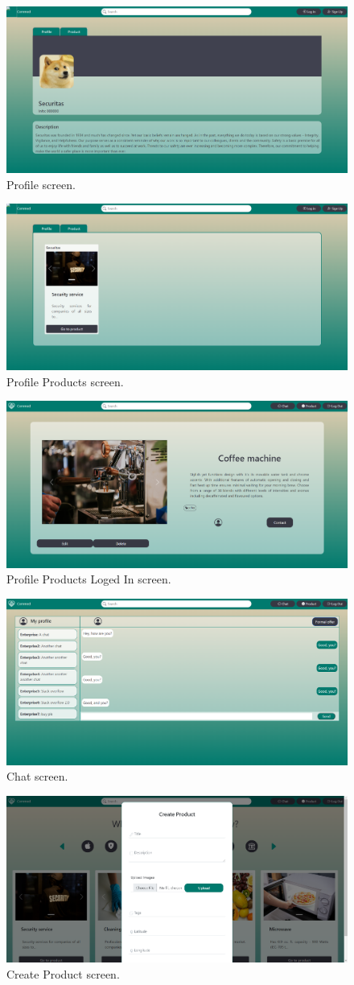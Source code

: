 \documentclass[./main.tex]{subfiles}
\begin{document}
\begin{figure}[H]
  \centering
  \includegraphics[width=0.5\linewidth]{img/webclient_6.png}
  \caption{Profile screen.}
  \label{fig:webclient-screen-5}
\end{figure}
\begin{figure}[H]
  \centering
  \includegraphics[width=0.5\linewidth]{img/webclient_7.png}
  \caption{Profile Products screen.}
  \label{fig:webclient-screen-6}
\end{figure}
\begin{figure}[H]
  \centering
  \includegraphics[width=0.5\linewidth]{img/webclient_8.png}
  \caption{Profile Products Loged In screen.}
  \label{fig:webclient-screen-7}
\end{figure}
\begin{figure}[H]
  \centering
  \includegraphics[width=0.5\linewidth]{img/webclient_9.png}
  \caption{Chat screen.}
  \label{fig:webclient-screen-8}
\end{figure}
\begin{figure}[H]
  \centering
  \includegraphics[width=0.5\linewidth]{img/webclient_10.png}
  \caption{Create Product screen.}
  \label{fig:webclient-screen-9}
\end{figure}
\end{document}
